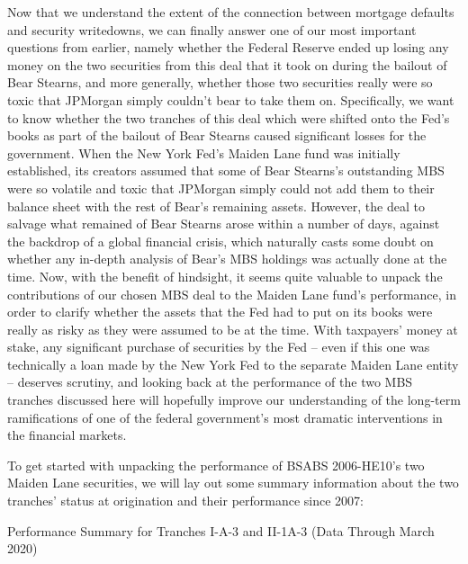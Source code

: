 \documentclass[12pt]{article}
\begin{document}
Now that we understand the extent of the connection between mortgage defaults and security writedowns, we can finally answer one of our most important questions from earlier, namely whether the Federal Reserve ended up losing any money on the two securities from this deal that it took on during the bailout of Bear Stearns, and more generally, whether those two securities really were so toxic that JPMorgan simply couldn’t bear to take them on. Specifically, we want to know whether the two tranches of this deal which were shifted onto the Fed’s books as part of the bailout of Bear Stearns caused significant losses for the government. When the New York Fed’s Maiden Lane fund was initially established, its creators assumed that some of Bear Stearns’s outstanding MBS were so volatile and toxic that JPMorgan simply could not add them to their balance sheet with the rest of Bear’s remaining assets. However, the deal to salvage what remained of Bear Stearns arose within a number of days, against the backdrop of a global financial crisis, which naturally casts some doubt on whether any in-depth analysis of Bear’s MBS holdings was actually done at the time. Now, with the benefit of hindsight, it seems quite valuable to unpack the contributions of our chosen MBS deal to the Maiden Lane fund’s performance, in order to clarify whether the assets that the Fed had to put on its books were really as risky as they were assumed to be at the time. With taxpayers’ money at stake, any significant purchase of securities by the Fed – even if this one was technically a loan made by the New York Fed to the separate Maiden Lane entity – deserves scrutiny, and looking back at the performance of the two MBS tranches discussed here will hopefully improve our understanding of the long-term ramifications of one of the federal government’s most dramatic interventions in the financial markets.

	To get started with unpacking the performance of BSABS 2006-HE10’s two Maiden Lane securities, we will lay out some summary information about the two tranches’ status at origination and their performance since 2007:

\begin{table}[h]
	\centering
	
	\caption{Performance Summary for Tranches I-A-3 and II-1A-3 (Data Through March 2020)}
	\label{tab:table_maiden_lane_performance}
\end{table}
\end{document}
